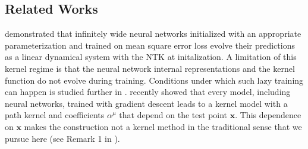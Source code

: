\documentclass{article} %
\def\x{\bm x}
\begin{document}
\subsection{Related Works}

\cite{Jacot2018NeuralTK} demonstrated that infinitely wide neural networks initialized with an appropriate parameterization and trained on mean square error loss evolve their predictions as a linear dynamical system with the NTK at initalization. %
A limitation of this kernel regime is that the neural network internal representations and the kernel function do not evolve during training. Conditions under which such lazy training can happen is studied further in \citep{Chizat2019OnLT,liu_belkin}. \citet{domingos2020model} recently %
showed that every model, including neural networks, trained with gradient descent leads to a kernel model with a path kernel and coefficients $\alpha^\mu$ that depend on the test point $\x$. This dependence on $\x$ makes the construction not a kernel method in the traditional sense that we pursue here (see Remark 1 in \citep{domingos2020model}).


\end{document}

